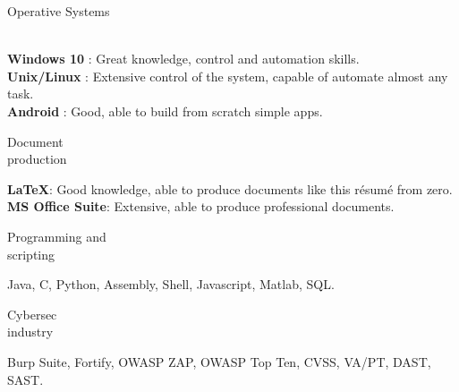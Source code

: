 \begin{minipage}{.3\textwidth}
	\flushright Operative Systems \\ \faWindows \ \faLinux \ \faApple \ \faAndroid
\end{minipage}
\hfill
\begin{minipage}{.65\textwidth}
	\vfill
	\textbf{Windows 10} \faWindows : Great knowledge, control and automation skills. 
	\\
	\textbf{Unix/Linux} \faLinux : Extensive control of the system, capable of automate almost any task.
	\\
	\textbf{Android} \faAndroid : Good, able to build from scratch simple apps.  
	\vfill
\end{minipage}

\bigskip

\begin{minipage}{.3\textwidth}
	\flushright Document \\ production \faBook 
\end{minipage}
\hfill
\begin{minipage}{.65\textwidth}
	\vfill
	\textbf{\LaTeX}: Good knowledge, able to produce documents like this résumé from zero.
	\\
	\textbf{MS Office Suite}: Extensive, able to produce professional documents.
	\vfill
\end{minipage}

\bigskip

\begin{minipage}{.3\textwidth}
	\flushright Programming and \\ scripting \faTerminal
\end{minipage}
\hfill
\begin{minipage}{.65\textwidth}
	\vfill
	Java, C, Python, Assembly, Shell, Javascript, Matlab, SQL. 
	\vfill
\end{minipage}

\bigskip

\begin{minipage}{.3\textwidth}
	\flushright Cybersec \\ industry \faExpeditedssl
\end{minipage}
\hfill
\begin{minipage}{.64\textwidth}
	\vfill
	Burp Suite, Fortify, OWASP ZAP, OWASP Top Ten, CVSS, VA/PT, DAST, SAST.
	\vfill
\end{minipage}